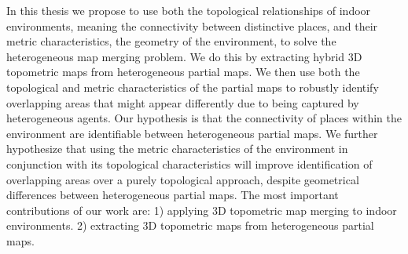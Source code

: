 In this thesis we propose to use both the topological relationships of indoor environments, meaning the connectivity between distinctive places, and their metric characteristics, the geometry of the environment, to solve the heterogeneous map merging problem.  We do this by extracting hybrid 3D topometric maps from heterogeneous partial maps. We then use both the topological and metric characteristics of the partial maps to robustly identify overlapping areas that might appear differently due to being captured by heterogeneous agents.  Our hypothesis is that the connectivity of places within the environment are identifiable between heterogeneous partial maps. We further hypothesize that using the metric characteristics of the environment in conjunction with its topological characteristics will improve identification of overlapping areas over a purely topological approach, despite geometrical differences between heterogeneous partial maps. The most important contributions of our work are: 1) applying 3D topometric map merging to indoor environments. 2) extracting 3D topometric maps from heterogeneous partial maps.